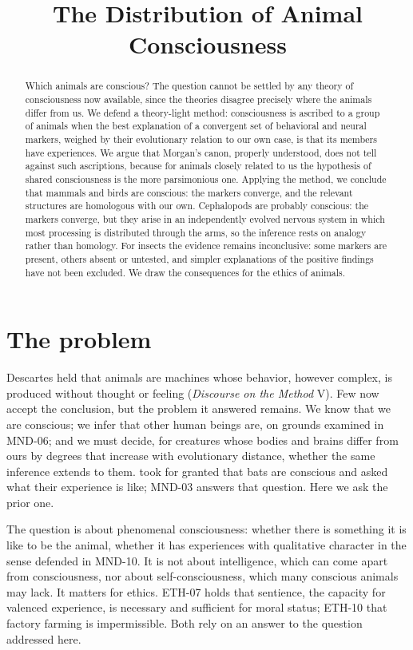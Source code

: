 \documentclass{situationist-preprint}
\title{The Distribution of Animal Consciousness}
\begin{document}
\maketitle

\begin{abstract}
Which animals are conscious? The question cannot be settled by any theory of consciousness now available, since the theories disagree precisely where the animals differ from us. We defend a theory-light method: consciousness is ascribed to a group of animals when the best explanation of a convergent set of behavioral and neural markers, weighed by their evolutionary relation to our own case, is that its members have experiences. We argue that Morgan's canon, properly understood, does not tell against such ascriptions, because for animals closely related to us the hypothesis of shared consciousness is the more parsimonious one. Applying the method, we conclude that mammals and birds are conscious: the markers converge, and the relevant structures are homologous with our own. Cephalopods are probably conscious: the markers converge, but they arise in an independently evolved nervous system in which most processing is distributed through the arms, so the inference rests on analogy rather than homology. For insects the evidence remains inconclusive: some markers are present, others absent or untested, and simpler explanations of the positive findings have not been excluded. We draw the consequences for the ethics of animals.
\end{abstract}

\section{The problem}

Descartes held that animals are machines whose behavior, however complex, is produced without thought or feeling (\emph{Discourse on the Method} V). Few now accept the conclusion, but the problem it answered remains. We know that we are conscious; we infer that other human beings are, on grounds examined in MND-06; and we must decide, for creatures whose bodies and brains differ from ours by degrees that increase with evolutionary distance, whether the same inference extends to them. \citet{Nagel1974} took for granted that bats are conscious and asked what their experience is like; MND-03 answers that question. Here we ask the prior one.

The question is about phenomenal consciousness: whether there is something it is like to be the animal, whether it has experiences with qualitative character in the sense defended in MND-10. It is not about intelligence, which can come apart from consciousness, nor about self-consciousness, which many conscious animals may lack. It matters for ethics. ETH-07 holds that sentience, the capacity for valenced experience, is necessary and sufficient for moral status; ETH-10 that factory farming is impermissible. Both rely on an answer to the question addressed here.
\end{document}
